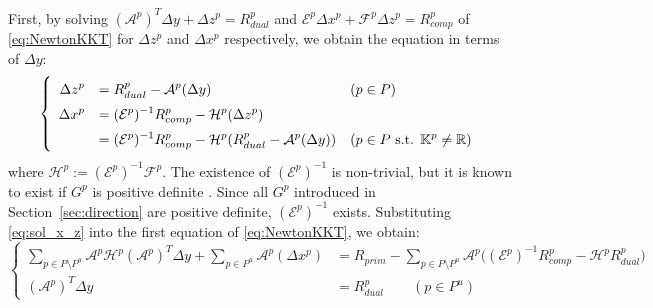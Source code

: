 First, by solving $(\mathcal{A}^p)^T \Delta y + \Delta z^p = R_{dual}^p$ and $\mathcal{E}^p \Delta x^p + \mathcal{F}^p \Delta z^p = R_{comp}^p$ of \eqref{eq:NewtonKKT} for $\Delta z^p$ and $\Delta x^p$ respectively, we obtain the equation in terms of $\Delta y$:
\begin{equation}
    \everymath{\displaystyle}
    \renewcommand{\arraystretch}{1.5}
    \left\{
    \begin{array}{rll}
    \Delta z^p &= R_{dual}^p - \mathcal{A}^p(\Delta y)  & (p\in P)\\
    \Delta x^p &= (\mathcal{E}^p)^{-1}R_{comp}^p - \mathcal{H}^p(\Delta z^p) \\
               &= (\mathcal{E}^p)^{-1}R_{comp}^p - \mathcal{H}^p(R_{dual}^p - \mathcal{A}^p(\Delta y))  & (p\in P \text{ s.t. } \mathbb{K}^p \neq \mathbb{R})
   \end{array}
   \right.
   \label{eq:sol_x_z}
\end{equation}
where $\mathcal{H}^p := (\mathcal{E}^p)^{-1}\mathcal{F}^p$. 
The existence of $(\mathcal{E}^p)^{-1}$ is non-trivial, but it is known to exist if $G^p$ is positive definite \cite{todd1998}. 
Since all $G^p$ introduced in Section~\ref{sec:direction} are positive definite, $(\mathcal{E}^p)^{-1}$ exists.
Substituting \eqref{eq:sol_x_z} into the first equation of \eqref{eq:NewtonKKT}, we obtain:
\begin{equation}
    \left\{
    \begin{aligned}
        \sum_{p \in P\setminus P^u} \mathcal{A}^p\mathcal{H}^p(\mathcal{A}^p)^T\Delta y + \sum_{p \in P^u} \mathcal{A}^p(\Delta x^p) 
            &= R_{prim} - \sum_{p \in P\setminus P^u} \mathcal{A}^p \big( (\mathcal{E}^p)^{-1}R_{comp}^p - \mathcal{H}^p R_{dual}^p \big) \\
        (\mathcal{A}^p)^T \Delta y 
            &= R^p_{dual} \qquad (p\in P^u)
    \end{aligned}
    \right.
    \label{eq:Schur_complement}
\end{equation}


